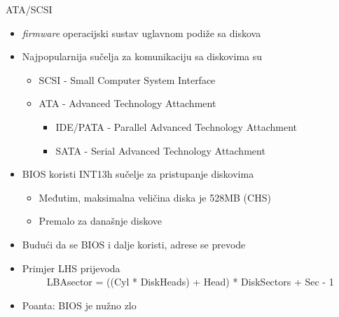 \documentclass[croatian,t]{beamer} %
\begin{document}
	\begin{frame}{ATA/SCSI}
		\begin{itemize}
			\item \emph{firmware} operacijski sustav uglavnom podiže sa diskova
			\item Najpopularnija sučelja za komunikaciju sa diskovima su		
			\begin{itemize}
				\item SCSI - Small Computer System Interface
			\end{itemize}
			\begin{itemize}
				\item ATA - Advanced Technology Attachment
				\begin{itemize}
					\item IDE/PATA - Parallel Advanced Technology Attachment
					\item SATA - Serial Advanced Technology Attachment				
				\end{itemize}
			\end{itemize}
			\item BIOS koristi INT13h sučelje za pristupanje diskovima
				\begin{itemize}
					\item Međutim, maksimalna veličina diska je 528MB (CHS)
					\item Premalo za današnje diskove
				\end{itemize}
			\item Budući da se BIOS i dalje koristi, adrese se prevode
			\item Primjer LHS prijevoda \\
			~~~~~LBAsector = ((Cyl * DiskHeads) + Head) * DiskSectors + Sec - 1
			\item Poanta: BIOS je nužno zlo
		\end{itemize}
	\end{frame} 
\end{document}
